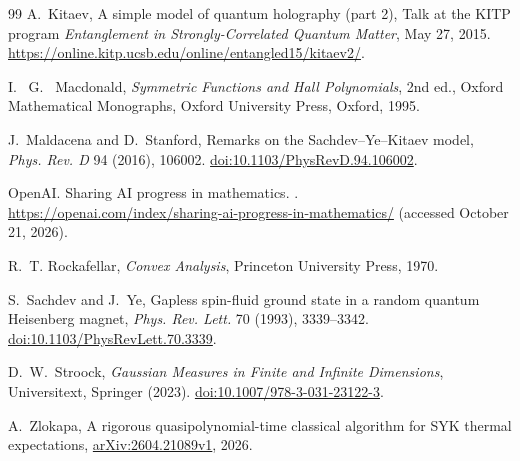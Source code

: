 \documentclass[11pt]{article}
\theoremstyle{remark}
\begin{document}
\begin{thebibliography}{99}
A.~Kitaev,
\newblock A simple model of quantum holography (part 2),
\newblock Talk at the KITP program \emph{Entanglement in Strongly-Correlated
Quantum Matter}, May 27, 2015.
\newblock \url{https://online.kitp.ucsb.edu/online/entangled15/kitaev2/}.

I.~ G.~ Macdonald,
\newblock \emph{Symmetric Functions and Hall Polynomials},
\newblock 2nd ed.,
\newblock Oxford Mathematical Monographs,
\newblock Oxford University Press, Oxford, 1995.

J.~Maldacena and D.~Stanford,
\newblock Remarks on the Sachdev--Ye--Kitaev model,
\newblock \emph{Phys. Rev. D} 94 (2016), 106002.
\newblock \href{https://doi.org/10.1103/PhysRevD.94.106002}
{doi:10.1103/PhysRevD.94.106002}.

OpenAI.
\newblock Sharing AI progress in mathematics.
.
\url{https://openai.com/index/sharing-ai-progress-in-mathematics/}
(accessed October 21, 2026).


R.~T. Rockafellar,
\newblock \emph{Convex Analysis},
\newblock Princeton University Press, 1970.

S.~Sachdev and J.~Ye,
\newblock Gapless spin-fluid ground state in a random quantum Heisenberg
magnet,
\newblock \emph{Phys. Rev. Lett.} 70 (1993), 3339--3342.
\newblock \href{https://doi.org/10.1103/PhysRevLett.70.3339}
{doi:10.1103/PhysRevLett.70.3339}.

D.~W.~Stroock,
\newblock \emph{Gaussian Measures in Finite and Infinite Dimensions},
\newblock Universitext, Springer (2023).
\newblock \href{https://doi.org/10.1007/978-3-031-23122-3}
{doi:10.1007/978-3-031-23122-3}.



A.~Zlokapa,
\newblock A rigorous quasipolynomial-time classical algorithm for SYK thermal
expectations,
\newblock \href{https://arxiv.org/abs/2604.21089}
{arXiv:2604.21089v1}, 2026.
\end{thebibliography}
\end{document}
